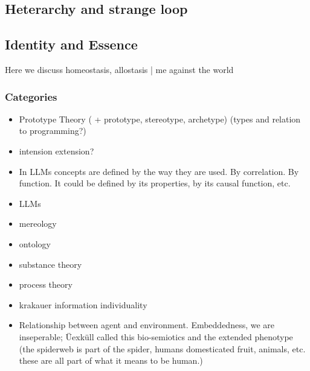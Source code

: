 
\subsection{Heterarchy and strange loop}

\subsection{Identity and Essence}
Here we discuss homeostasis, allostasis | me against the world
\subsubsection{Categories}
\begin{itemize}
    \item Prototype Theory ( + prototype, stereotype, archetype) (types and relation to programming?)
    \item intension extension?
    \item In LLMs concepts are defined by the way they are used. By correlation. By function. It could be defined by its properties, by its causal function, etc. 
    \item LLMs
    \item mereology
    \item ontology
\end{itemize}

\begin{itemize}
    \item substance theory
    \item process theory
    \item krakauer information individuality
    \item Relationship between agent and environment. Embeddedness, we are inseperable; Üexküll called this bio-semiotics and the extended phenotype (the spiderweb is part of the spider, humans domesticated fruit, animals, etc. these are all part of what it means to be human.)
\end{itemize}

